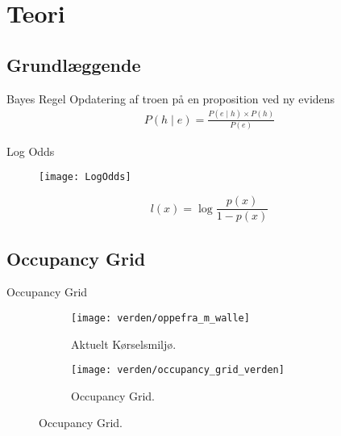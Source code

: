 \section{Teori}

\subsection{Grundlæggende}
\begin{frame}{Bayes Regel}
Opdatering af troen på en proposition ved ny evidens
\[
\begin{split}
P(h \mid e) = \frac{P(e \mid h) \times P(h)}{P(e)}
\end{split}
\]
\end{frame}

\begin{frame}{Log Odds}
\begin{figure}
\centering \texttt{[image: LogOdds]}
\label{logoddsimg}
\end{figure}

%

\[
l(x) = \log \frac{p(x)}{1 - p(x)}
\]

\end{frame}

\subsection{Occupancy Grid}
\begin{frame}{Occupancy Grid}
\begin{figure}[h] %
\centering
	\begin{subfigure}[b]{.48\textwidth}
	\centering
	\texttt{[image: verden/oppefra\_m\_walle]}
	\caption{Aktuelt Kørselsmiljø.}
	\label{map:world}
	\end{subfigure}
	\hfill
	\begin{subfigure}[b]{.48\textwidth}
	\centering
	\texttt{[image: verden/occupancy\_grid\_verden]}
	\caption{Occupancy Grid.}
	\label{map:occupancy_grid}
	\end{subfigure}

\end{figure}
\end{frame}

